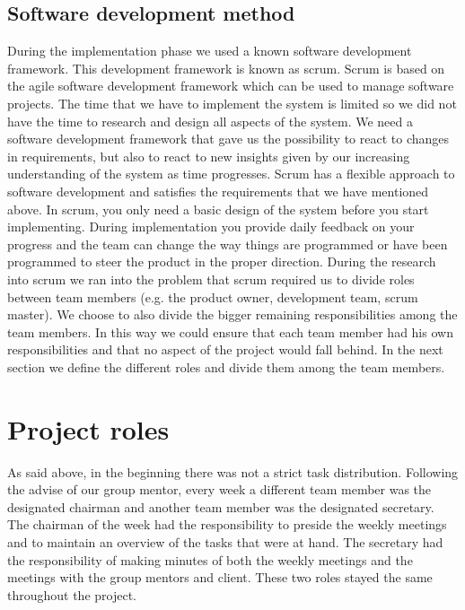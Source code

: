 \subsection{Software development method}\label{software_development_method}
During the implementation phase we used a known software development framework.
This development framework is known as scrum.
Scrum is based on the agile software development framework which can be used to 
manage software projects.
The time that we have to implement the system is limited so we did not have the time to research and design all aspects of the system. We need a software development framework that gave us the possibility to react to changes in requirements, but also to react to new insights given by our increasing understanding of the system as time progresses.
Scrum has a flexible approach to software development and satisfies the requirements that we have mentioned above.
In scrum, you only need a basic design of the system before you start implementing.
During implementation you provide daily feedback on your progress and the team can change the way things are programmed or have been programmed to steer the product in the proper direction.
During the research into scrum we ran into the problem that scrum required us to divide roles between team members (e.g. the product owner, development team, scrum master).
We choose to also divide the bigger remaining responsibilities among the team members.
In this way we could ensure that each team member had his own responsibilities and that no aspect of the project would fall behind.
In the next section we define the different roles and divide them among the team members.

\section{Project roles}
As said above, in the beginning there was not a strict task distribution.
Following the advise of our group mentor, every week a different team member was the designated chairman and another team member was the designated secretary.
The chairman of the week had the responsibility to preside the weekly meetings and to maintain an overview of the tasks that were at hand.
The secretary had the responsibility of making minutes of both the weekly meetings and the meetings with the group mentors and client.
These two roles stayed the same throughout the project.\\

